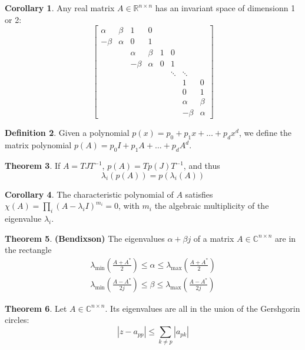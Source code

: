 \documentclass[12pt, openany]{report}
\theoremstyle{definition}
\newtheorem{thm}{Theorem}[chapter]
\newtheorem{definition}[thm]{Definition}
\newtheorem{corollary}[thm]{Corollary}
\newcommand{\R}{\mathbb{R}}
\newcommand{\C}{\mathbb{C}}
\begin{document}
\begin{corollary}
    Any real matrix $A\in \R^{n\times n}$ has an invariant space of dimensionn 1 or 2:
    \begin{equation}
        \begin{bmatrix}
            \alpha & \beta & 1 & 0 &&\\
            -\beta & \alpha & 0 & 1&&\\
            & & \alpha & \beta & 1& 0&& \\
            & & -\beta & \alpha & 0 & 1&&\\
            &&&&& \ddots & \ddots &\\
            &&&&&& 1&0\\
            &&&&&& 0&1\\
            &&&&&& \alpha & \beta\\
            &&&&&& -\beta & \alpha
        \end{bmatrix}
    \end{equation}
\end{corollary}
\begin{definition}
    Given a polynomial $p(x) = p_0+p_1x+ \dots + p_d x^d$, we define the matrix polynomial $p(A) = p_0 I+p_1A+ \dots + p_d A^d$.
\end{definition}
\begin{thm}
    If $A=TJT^{-1}$, $p(A)=Tp(J)T^{-1}$, and thus 
    \begin{equation}
        \lambda_i(p(A)) = p(\lambda_i(A))
    \end{equation}
\end{thm}
\begin{corollary}
    The characteristic polynomial of $A$ satisfies $\chi(A)=\prod_i (A-\lambda_iI)^{m_i}=0$, with $m_i$ the algebraic multiplicity of the eigenvalue $\lambda_i$.
\end{corollary}
\begin{thm}\textbf{(Bendixson)}
    The eigenvalues $\alpha+\beta j$ of a matrix $A\in \C^{n\times n}$  are in the rectangle 
    \begin{align}
        \lambda_{\min} \left(\frac{A+A^*}{2}\right) \le \alpha \le \lambda_{\max} \left(\frac{A+A^*}{2}\right)\\
        \lambda_{\min} \left(\frac{A-A^*}{2j}\right) \le \beta \le \lambda_{\max} \left(\frac{A-A^*}{2j}\right)
    \end{align}
\end{thm}
\begin{thm}
    Let $A\in \C^{n\times n}$. Its eigenvalues are all in the union of the Gershgorin circles: 
    \begin{equation}
        |z-a_{pp}| \le \sum_{k\neq p} |a_{pk}|
    \end{equation}
\end{thm}
\end{document}
